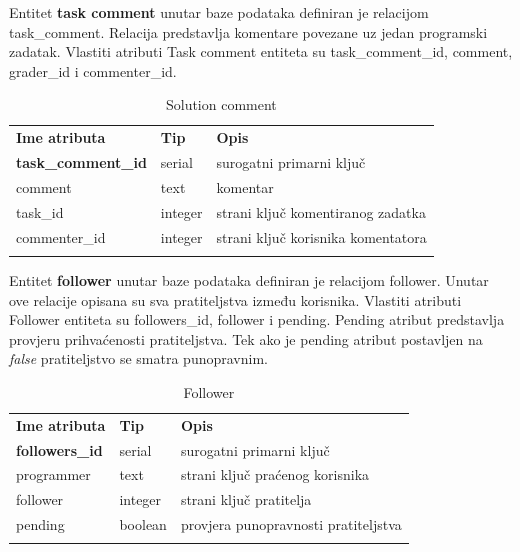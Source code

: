 \documentclass[times, utf8, zavrsni]{fer}
\begin{document}
		Entitet \textbf{task comment} unutar baze podataka definiran je relacijom task\_comment. Relacija predstavlja komentare povezane uz jedan programski zadatak. Vlastiti atributi Task comment entiteta su task\_comment\_id, comment, grader\_id i commenter\_id. 
		\begin{table}[H]
			\caption{Solution comment}
			\label{tbl:taskcomment}
			\centering
			\begin{tabu} to \textwidth {XXX}
				\tabucline[1.75pt]{-}
				\textbf{Ime atributa} & \textbf{Tip} & \textbf{Opis}\\ 				
				\tabucline[1.75pt]{-}
				\textbf{task\_comment\_id} & serial & surogatni primarni ključ\\ \hline
				comment & text & komentar\\ \hline
				task\_id & integer & strani ključ komentiranog zadatka\\ \hline
				commenter\_id & integer & strani ključ korisnika komentatora\\ \hline
				\tabucline[1.75pt]{-}
			\end{tabu}
		\end{table}
	
		Entitet \textbf{follower} unutar baze podataka definiran je relacijom follower. Unutar ove relacije opisana su sva pratiteljstva između korisnika. Vlastiti atributi Follower entiteta su followers\_id, follower i pending. Pending atribut predstavlja provjeru prihvaćenosti pratiteljstva. Tek ako je pending atribut postavljen na \textit{false} pratiteljstvo se smatra punopravnim.
		\begin{table}[H]
			\caption{Follower}
			\label{tbl:follower}
			\centering
			\begin{tabu} to \textwidth {XXX}
				\tabucline[1.75pt]{-}
				\textbf{Ime atributa} & \textbf{Tip} & \textbf{Opis}\\ 				
				\tabucline[1.75pt]{-}
				\textbf{followers\_id} & serial & surogatni primarni ključ\\ \hline
				programmer & text & strani ključ praćenog korisnika\\ \hline
				follower & integer & strani ključ pratitelja\\ \hline
				pending & boolean & provjera punopravnosti pratiteljstva\\ \hline
				\tabucline[1.75pt]{-}
			\end{tabu}
		\end{table}
		
\end{document}
